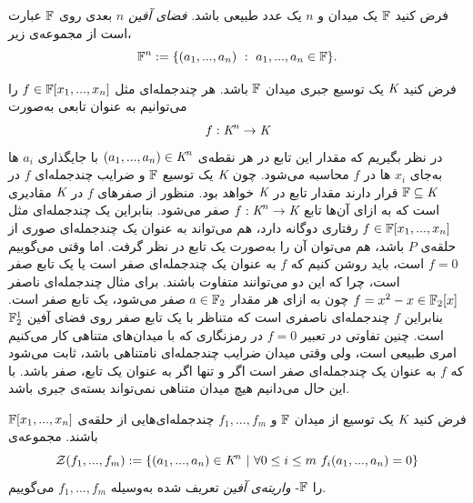 \begin{definition}
	فرض کنید 
	$\mathbb{F}$
	یک میدان و 
	$n$
	یک عدد طبیعی باشد. 
	\textit{فضای آفین}
	$n$
	بعدی روی 
	$\mathbb{F}$
	عبارت است از مجموعه‌ی زیر،
	$$\ffld^{n}:= \{(a_{1},...,a_{n}) \ : \ a_{1},...,a_{n}\in\ffld\}.$$
\end{definition}
فرض کنید 
$\textit{K}$
یک توسیع جبری میدان 
$\mathbb{F}$
باشد. هر چندجمله‌ای مثل 
$f\in\mathbb{F}[x_{1},...,x_{n}]$
را می‌توانیم به عنوان تابعی به‌صورت
$$f:\textit{K}^{n}\rightarrow \textit{K}$$
در نظر بگیریم که مقدار این تابع در هر نقطه‌ی 
$(a_{1},...,a_{n})\in \textit{K}^{n}$
با جایگذاری 
$a_{i}$
ها به‌جای 
$x_{i}$
ها در 
$f$
محاسبه می‌شود. چون 
$\textit{K}$
یک توسیع 
$\mathbb{F}$
و ضرایب چندجمله‌ای 
$f$
در 
$\mathbb{F}\subseteq \textit{K}$
قرار دارند مقدار تابع در 
$\textit{K}$
خواهد بود. منظور از صفر‌های 
$f$
در 
$\textit{K}$
مقادیری است که به ازای آن‌ها تابع 
$f:\textit{K}^{n}\rightarrow\textit{K}$
صفر می‌شود. بنابراین یک چندجمله‌ای مثل 
$f\in\mathbb{F}[x_{1},...,x_{n}]$
رفتاری دوگانه دارد، هم می‌تواند به عنوان یک چندجمله‌ای صوری از حلقه‌ی 
$P$
باشد، هم می‌توان آن را به‌صورت یک تابع در نظر گرفت. اما وقتی می‌گوییم 
$f = 0$
است، باید روشن کنیم که 
$f$
به عنوان یک چندجمله‌ای صفر است یا یک تابع صفر است، چرا که این دو می‌توانند متفاوت باشند. برای مثال چندجمله‌ای ناصفر 
$f = x^{2} - x\in \mathbb{F}_{2}[x]$
چون به ازای هر مقدار 
$a\in\mathbb{F}_{2}$
صفر می‌شود، یک تابع صفر است. بنابراین 
$f$
چندجمله‌ای ناصفری است که متناظر با یک تابع صفر روی فضای آفین 
$\mathbb{F}_{2}^{1}$
است. چنین تفاوتی در تعبیر 
$f = 0$
در رمزنگاری که با میدان‌های متناهی کار می‌کنیم امری طبیعی است، ولی وقتی میدان ضرایب چند‌جمله‌ای نامتناهی باشد، ثابت می‌شود
{\small \cite[ص.۳]{IVAcox}}
که 
$f$
به عنوان یک چندجمله‌ای صفر است اگر و تنها اگر به عنوان یک تابع، صفر باشد. 
با این حال می‌دانیم هیچ میدان متناهی نمی‌تواند بسته‌ی جبری باشد.
\begin{definition}
	فرض کنید 
	$\textit{K}$
	یک توسیع از میدان 
	$\mathbb{F}$
	و 
	$f_{1},...,f_{m}$
	چندجمله‌ای‌هایی از حلقه‌ی 
	$\mathbb{F}[x_{1},...,x_{n}]$
	باشند. مجموعه‌ی 
	$$\mZ(f_{1},...,f_{m}):= \{(a_{1},...,a_{n})\in\fld^{n} \ | \ \fa 0\leq i\leq m  \ f_{i}(a_{1},...,a_{n}) = 0 \}$$
	را 
	$\mathbb{F}$-
	\textit{واریته‌ی آفین}
	تعریف شده به‌وسیله‌ 
	$f_{1},...,f_{m}$
	می‌گوییم.
\end{definition}
